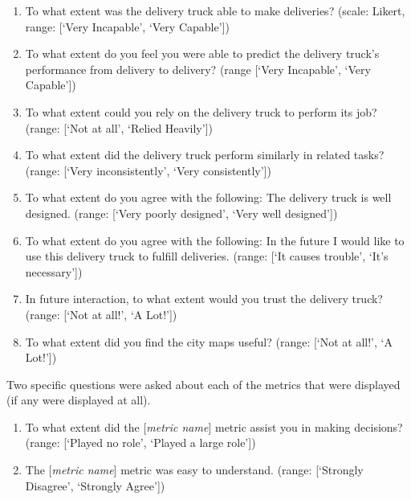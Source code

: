 \begin{quoting}
\begin{enumerate}[label=\textbf{Survey~\arabic*)}]
    \item To what extent was the delivery truck able to make deliveries? (scale: Likert, range: [`Very Incapable', `Very Capable'])
    \item To what extent do you feel you were able to predict the delivery truck's performance from delivery to delivery? (range [`Very Incapable', `Very Capable'])
    \item To what extent could you rely on the delivery truck to perform its job? (range: [`Not at all', `Relied Heavily'])
    \item To what extent did the delivery truck perform similarly in related tasks? (range: [`Very inconsistently', `Very consistently'])
    \item To what extent do you agree with the following: The delivery truck is well designed. (range: [`Very poorly designed', `Very well designed'])
    \item To what extent do you agree with the following: In the future I would like to use this delivery truck to fulfill deliveries. (range: [`It causes trouble', `It's necessary'])
    \item In future interaction, to what extent would you trust the delivery truck? (range: [`Not at all!', `A Lot!'])
    \item To what extent did you find the city maps useful? (range: [`Not at all!', `A Lot!'])
\end{enumerate}
\end{quoting}

Two specific questions were asked about each of the \famsec{} metrics that were displayed (if any were displayed at all).
\begin{quoting}
\begin{enumerate}[label=\textbf{\famsec~\arabic*)}]
    \item To what extent did the [\emph{metric name}] metric assist you in making decisions? (range: [`Played no role', `Played a large role']) 
    \item The [\emph{metric name}] metric was easy to understand. (range: [`Strongly Disagree', `Strongly Agree']) 
\end{enumerate}
\end{quoting}

